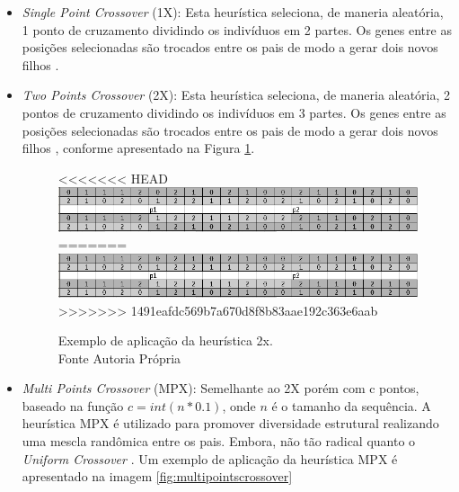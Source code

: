  \begin{itemize}
 	
 		\item \textit{Single Point Crossover} (1X): Esta heurística seleciona, de maneria aleatória, 1 ponto de cruzamento dividindo os indivíduos em 2 partes. Os genes entre as posições selecionadas são trocados entre os pais de modo a gerar dois novos filhos \cite{benitez2015algoritmo}.
 	
 	\item \textit{Two Points Crossover} (2X): Esta heurística seleciona, de maneria aleatória, 2 pontos de cruzamento dividindo os indivíduos em 3 partes. Os genes entre as posições selecionadas são trocados entre os pais de modo a gerar dois novos filhos \cite{benitez2015algoritmo}, conforme apresentado na Figura \ref{fig:twopointscrossover}.
 	
 	
 	\begin{figure}[!htb]
 		\centering
<<<<<<< HEAD
 		\includegraphics[scale=0.8]{Imagens/TwoPointsCrossover.png}
=======
 		\includegraphics{Imagens/TwoPointsCrossover.png}
>>>>>>> 1491eafdc569b7a670d8f8b83aae192c363e6aab
 		\caption{Exemplo de aplicação da heurística 2x. \\Fonte Autoria Própria}
 		\label{fig:twopointscrossover}
 	\end{figure}
 	
 	
 	
 	
 	\item \textit{Multi Points Crossover} (MPX): Semelhante ao 2X porém com c pontos, baseado na função $c = int(n * 0.1)$, onde $n$ é o tamanho da sequência. A heurística MPX é utilizado para promover diversidade estrutural realizando uma mescla randômica entre os pais. Embora, não tão radical quanto o \textit{Uniform  Crossover} \cite{sabar2015automatic}. Um exemplo de aplicação da heurística MPX é apresentado na imagem \ref{fig:multipointscrossover}
 	

\end{itemize}
